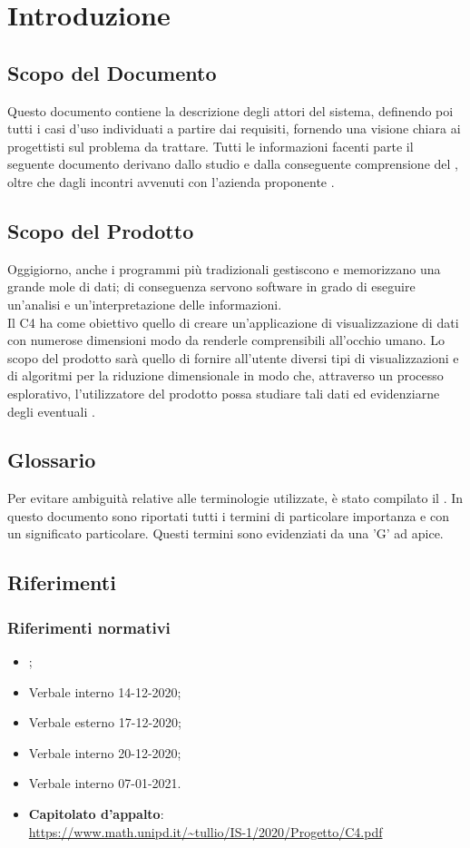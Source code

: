 \section{Introduzione}
\subsection{Scopo del Documento}
Questo documento contiene la descrizione degli attori del sistema, definendo poi tutti i casi d'uso individuati a partire dai requisiti, fornendo una visione chiara ai progettisti sul problema da trattare. Tutti le informazioni facenti parte il seguente documento derivano dallo studio e dalla conseguente comprensione del , oltre che dagli incontri avvenuti con l'azienda proponente \Proponente{}.
\subsection{Scopo del Prodotto}
Oggigiorno, anche i programmi più tradizionali gestiscono e memorizzano una grande mole di dati; di conseguenza servono software in grado di eseguire un'analisi e un'interpretazione delle informazioni.\\
Il  C4 ha come obiettivo quello di creare un'applicazione di visualizzazione di dati con numerose dimensioni modo da renderle comprensibili all'occhio umano.  Lo scopo del prodotto sarà quello di fornire all'utente diversi tipi di visualizzazioni e di algoritmi per la riduzione dimensionale in modo che, attraverso un processo esplorativo, l'utilizzatore del prodotto possa studiare tali dati ed evidenziarne degli eventuali . 
\subsection{Glossario}
Per evitare ambiguità relative alle terminologie utilizzate, è stato compilato il . In questo documento sono riportati tutti i termini di particolare importanza e con un significato particolare. Questi termini sono evidenziati da una 'G' ad apice.
\subsection{Riferimenti}
\subsubsection{Riferimenti normativi}
\begin{itemize}
	\item {};
	\item Verbale interno 14-12-2020;
	\item Verbale esterno 17-12-2020;
	\item Verbale interno 20-12-2020;
	\item Verbale interno 07-01-2021.
	\item \textbf{Capitolato d'appalto}:\\
	\textcolor{blue}{\url{https://www.math.unipd.it/~tullio/IS-1/2020/Progetto/C4.pdf}}
\end{itemize}


